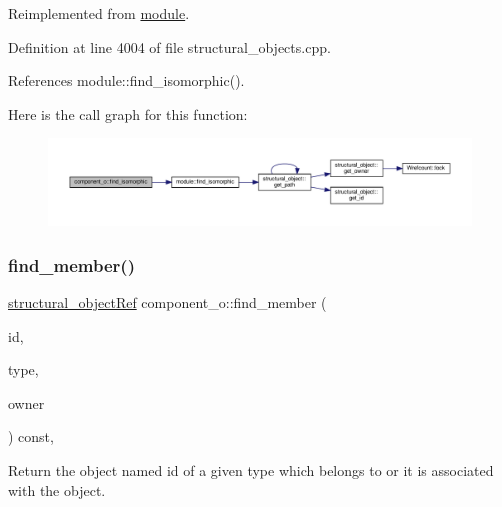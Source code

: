 Reimplemented from \hyperlink{classmodule_a9d8b3c8198d31d1440cb3df2fed8f346}{module}.



Definition at line 4004 of file structural\+\_\+objects.\+cpp.



References module\+::find\+\_\+isomorphic().

Here is the call graph for this function\+:
\nopagebreak
\begin{figure}[H]
\begin{center}
\leavevmode
\includegraphics[width=350pt]{de/d6c/classcomponent__o_a8bb03d2af520a73c01e330f137fd9fd4_cgraph}
\end{center}
\end{figure}
\mbox{\label{classcomponent__o_a266d073fa06ab5799ec890d092552b00}} 
\subsubsection{\texorpdfstring{find\+\_\+member()}{find\_member()}}
{\footnotesize\ttfamily \hyperlink{structural__objects_8hpp_a8ea5f8cc50ab8f4c31e2751074ff60b2}{structural\+\_\+object\+Ref} component\+\_\+o\+::find\+\_\+member (\begin{DoxyParamCaption}\item[{const std\+::string \&}]{id,  }\item[{\hyperlink{structural__objects_8hpp_acf52399aecacb7952e414c5746ce6439}{so\+\_\+kind}}]{type,  }\item[{const \hyperlink{structural__objects_8hpp_a8ea5f8cc50ab8f4c31e2751074ff60b2}{structural\+\_\+object\+Ref}}]{owner }\end{DoxyParamCaption}) const\hspace{0.3cm}{\ttfamily [override]}, {\ttfamily [virtual]}}



Return the object named id of a given type which belongs to or it is associated with the object. 



